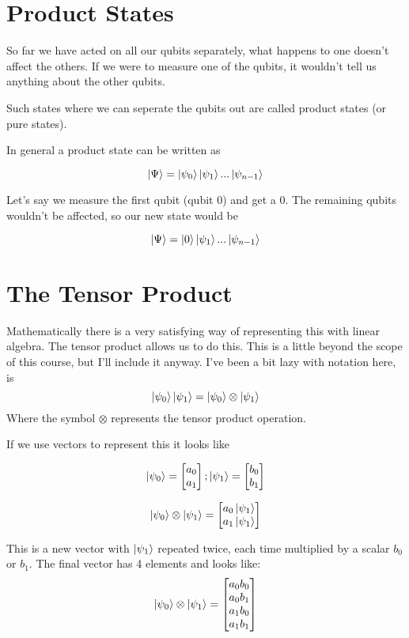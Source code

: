 \documentclass{book}
\begin{document}
\section{ Product States }

So far we have acted on all our qubits separately, what happens to one doesn't affect the others. If we were to measure one of the qubits, it wouldn't tell us anything about the other qubits. 

Such states where we can seperate the qubits out are called product states (or pure states). 

In general a product state can be written as 

$$ \ket{\Psi} = \ket{\psi_0}\ket{\psi_1}...\ket{\psi_{n-1}}$$

Let's say we measure the first qubit (qubit 0) and get a 0. The remaining qubits wouldn't be affected, so our new state would be 

$$ \ket{\Psi} = \ket{0}\ket{\psi_1}...\ket{\psi_{n-1}}$$


\section{ The Tensor Product }

Mathematically there is a very satisfying way of representing this with linear algebra. The tensor product allows us to do this. This is a little beyond the scope of this course, but I'll include it anyway. 
I've been a bit lazy with notation here, is
$$ \ket{\psi_0}\ket{\psi_1} = \ket{\psi_0} \otimes \ket{\psi_1} $$
Where the symbol $\otimes$ represents the tensor product operation. 

If we use vectors to represent this it looks like 

$$ \ket{\psi_0} = \begin{bmatrix} a_0 \\ a_1 \end{bmatrix} ; \ket{\psi_1} = \begin{bmatrix} b_0 \\ b_1 \end{bmatrix} $$

$$
 \ket{\psi_0} \otimes \ket{\psi_1} = \begin{bmatrix} a_0\ket{\psi_1} \\ a_1\ket{\psi_1} \end{bmatrix}
$$

This is a new vector with $\ket{\psi_1}$ repeated twice, each time multiplied by a scalar $b_0$ or $b_1$. The final vector has 4 elements and looks like: 
$$
 \ket{\psi_0} \otimes \ket{\psi_1} = \begin{bmatrix} a_0 b_0 \\ a_0 b_1 \\ a_1b_0 \\ a_1 b_1 \end{bmatrix}
$$
\end{document}

